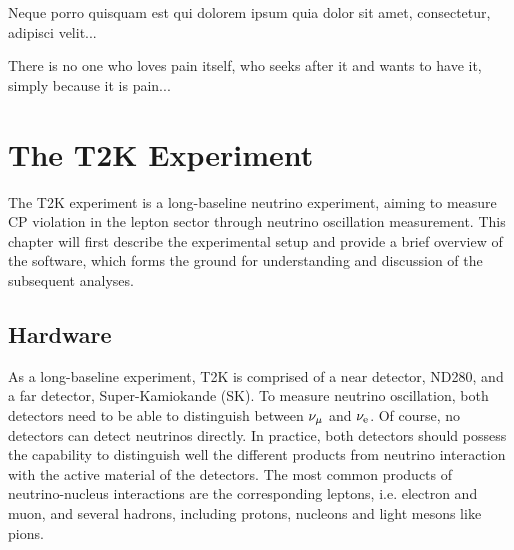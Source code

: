 \begin{savequote}[8cm]
\textlatin{Neque porro quisquam est qui dolorem ipsum quia dolor sit amet, consectetur, adipisci velit...}

There is no one who loves pain itself, who seeks after it and wants to have it, simply because it is pain...
\end{savequote}

\chapter{\label{ch:t2k}The T2K Experiment} 

\minitoc
The T2K experiment is a long-baseline neutrino experiment, aiming to measure CP violation in the lepton sector through neutrino oscillation measurement.
This chapter will first describe the experimental setup and provide a brief overview of the software, which forms the ground for understanding and discussion of the subsequent analyses.


\section{Hardware}
  As a long-baseline experiment, T2K is comprised of a near detector, ND280, and a far detector, Super-Kamiokande (SK).
  To measure neutrino oscillation, both detectors need to be able to distinguish between $\nu_{\mu}$ and $\nu_{\textrm{e}}$.  
  Of course, no detectors can detect neutrinos directly.
  In practice, both detectors should possess the capability to distinguish well the different products from neutrino interaction with the active material of the detectors.
  The most common products of neutrino-nucleus interactions are the corresponding leptons, i.e. electron and muon, and several hadrons, including protons, nucleons and light mesons like pions.

